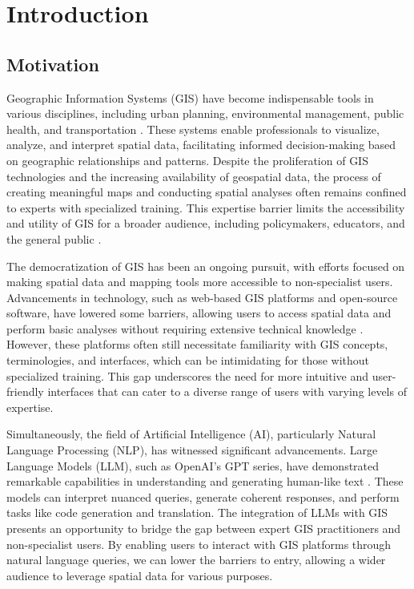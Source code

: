 
%

\chapter{Introduction}
\label{cha:introduction}

\section{Motivation}


Geographic Information Systems (GIS) have become indispensable tools in various disciplines, including urban planning, environmental management, public health, and transportation \cite{longley2015geographic}. These systems enable professionals to visualize, analyze, and interpret spatial data, facilitating informed decision-making based on geographic relationships and patterns. Despite the proliferation of GIS technologies and the increasing availability of geospatial data, the process of creating meaningful maps and conducting spatial analyses often remains confined to experts with specialized training. This expertise barrier limits the accessibility and utility of GIS for a broader audience, including policymakers, educators, and the general public \cite{haklay_neogeography_2013}.

The democratization of GIS has been an ongoing pursuit, with efforts focused on making spatial data and mapping tools more accessible to non-specialist users. Advancements in technology, such as web-based GIS platforms and open-source software, have lowered some barriers, allowing users to access spatial data and perform basic analyses without requiring extensive technical knowledge \cite{malakar_gis_2024}. However, these platforms often still necessitate familiarity with GIS concepts, terminologies, and interfaces, which can be intimidating for those without specialized training. This gap underscores the need for more intuitive and user-friendly interfaces that can cater to a diverse range of users with varying levels of expertise.

Simultaneously, the field of Artificial Intelligence (AI), particularly Natural Language Processing (NLP), has witnessed significant advancements. Large Language Models (LLM), such as OpenAI's GPT series, have demonstrated remarkable capabilities in understanding and generating human-like text \cite{b_evolution_2024}. These models can interpret nuanced queries, generate coherent responses, and perform tasks like code generation and translation. The integration of LLMs with GIS presents an opportunity to bridge the gap between expert GIS practitioners and non-specialist users. By enabling users to interact with GIS platforms through natural language queries, we can lower the barriers to entry, allowing a wider audience to leverage spatial data for various purposes.

